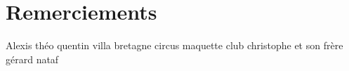 \chapter*{Remerciements}

Alexis théo quentin villa bretagne circus maquette club christophe et son frère gérard nataf

